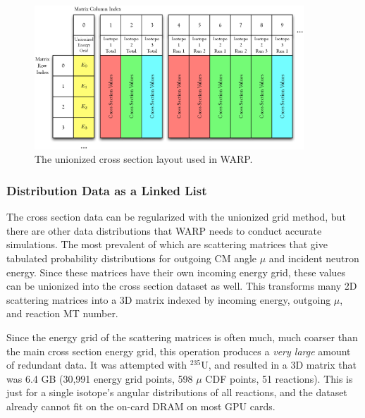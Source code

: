 \begin{figure}[h!] 
\centering
\includegraphics[width=0.9\textwidth]{graphics/unionized_overall.eps}
\caption{The unionized cross section layout used in WARP. \label{unionized_layout_overall} }
\end{figure}

\subsubsection{Distribution Data as a Linked List}

The cross section data can be regularized with the unionized grid method, but there are other data distributions that WARP needs to conduct accurate simulations.  The most prevalent of which are scattering matrices that give tabulated probability distributions for outgoing CM angle $\mu$ and incident neutron energy.  Since these matrices have their own incoming energy grid, these values can be unionized into the cross section dataset as well.  This transforms many 2D scattering matrices into a 3D matrix indexed by incoming energy, outgoing $\mu$, and reaction MT number.  

Since the energy grid of the scattering matrices is often much, much coarser than the main cross section energy grid, this operation produces a \emph{very large} amount of redundant data.  It was attempted with $^{235}$U, and resulted in a 3D matrix that was 6.4 GB (30,991 energy grid points, 598 $\mu$ CDF points, 51 reactions).  This is just for a single isotope's angular distributions of all reactions, and the dataset already cannot fit on the on-card DRAM on most GPU cards.  

